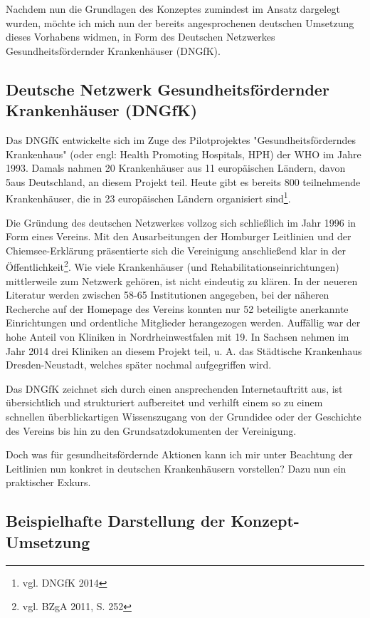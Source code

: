 Nachdem nun die Grundlagen des Konzeptes zumindest im Ansatz dargelegt wurden, möchte ich mich nun der bereits angesprochenen deutschen Umsetzung dieses Vorhabens widmen, in Form des Deutschen Netzwerkes Gesundheitsfördernder Krankenhäuser (DNGfK).

\subsection{Deutsche Netzwerk Gesundheitsfördernder Krankenhäuser (DNGfK)}
\label{sec:DeutscheNetzwerkGesundheitsfördernderKrankenhäuserDNGfK}

Das DNGfK entwickelte sich im Zuge des Pilotprojektes "Gesundheitsförderndes Krankenhaus" (oder engl: Health Promoting Hospitals, HPH) der WHO im Jahre 1993. Damals nahmen 20 Krankenhäuser aus 11 europäischen Ländern, davon 5aus Deutschland, an diesem Projekt teil. Heute gibt es bereits 800 teilnehmende Krankenhäuser, die in 23 europäischen Ländern organisiert sind\footnote{vgl. DNGfK 2014}.

Die Gründung des deutschen Netzwerkes vollzog sich schließlich im Jahr 1996 in Form eines Vereins. Mit den Ausarbeitungen der Homburger Leitlinien und der Chiemsee-Erklärung präsentierte sich die Vereinigung anschließend klar in der Öffentlichkeit\footnote{vgl. BZgA 2011, S. 252}. Wie viele Krankenhäuser (und Rehabilitationseinrichtungen) mittlerweile zum Netzwerk gehören, ist nicht eindeutig zu klären. In der neueren Literatur werden zwischen 58-65 Institutionen angegeben, bei der näheren Recherche auf der Homepage des Vereins konnten nur 52 beteiligte anerkannte Einrichtungen und ordentliche Mitglieder herangezogen werden. Auffällig war der hohe Anteil von Kliniken in Nordrheinwestfalen mit 19. In Sachsen nehmen im Jahr 2014 drei Kliniken an diesem Projekt teil, u. A. das Städtische Krankenhaus Dresden-Neustadt, welches später nochmal aufgegriffen wird.

Das DNGfK zeichnet sich durch einen ansprechenden Internetauftritt aus, ist übersichtlich und strukturiert aufbereitet und verhilft einem so zu einem schnellen überblickartigen Wissenszugang von der Grundidee oder der Geschichte des Vereins bis hin zu den Grundsatzdokumenten der Vereinigung.

Doch was für gesundheitsfördernde Aktionen kann ich mir unter Beachtung der Leitlinien nun konkret in deutschen Krankenhäusern vorstellen? Dazu nun ein praktischer Exkurs.

\subsection{Beispielhafte Darstellung der Konzept-Umsetzung }
\label{sec:BeispielhafteDarstellungDerKonzeptUmsetzung}

